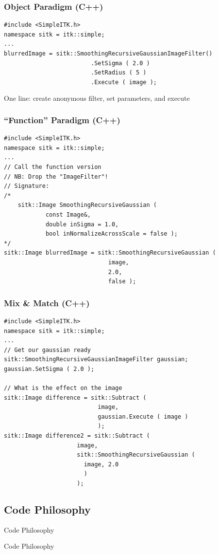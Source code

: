 \begin{frame}[fragile]
\frametitle{Object Paradigm (C++)}
\lstcpp
\begin{lstlisting}
#include <SimpleITK.h>
namespace sitk = itk::simple;
...
blurredImage = sitk::SmoothingRecursiveGaussianImageFilter()
                         .SetSigma ( 2.0 )
                         .SetRadius ( 5 )
                         .Execute ( image );
\end{lstlisting}
One line: create anonymous filter, set parameters, and execute
\end{frame}

\begin{frame}[fragile]
\frametitle{``Function'' Paradigm (C++)}
\lstcpp
\begin{lstlisting}
#include <SimpleITK.h>
namespace sitk = itk::simple;
...
// Call the function version
// NB: Drop the "ImageFilter"!
// Signature:
/*
    sitk::Image SmoothingRecursiveGaussian (
            const Image&,
            double inSigma = 1.0,
            bool inNormalizeAcrossScale = false );
*/
sitk::Image blurredImage = sitk::SmoothingRecursiveGaussian (
                              image,
                              2.0,
                              false );
\end{lstlisting}
\end{frame}

\begin{frame}[fragile]
\frametitle{Mix \& Match (C++)}
\lstcpp
\begin{lstlisting}
#include <SimpleITK.h>
namespace sitk = itk::simple;
...
// Get our gaussian ready
sitk::SmoothingRecursiveGaussianImageFilter gaussian;
gaussian.SetSigma ( 2.0 );

// What is the effect on the image
sitk::Image difference = sitk::Subtract (
                           image,
                           gaussian.Execute ( image )
                           );
sitk::Image difference2 = sitk::Subtract (
                     image,
                     sitk::SmoothingRecursiveGaussian (
                       image, 2.0
                       )
                     );

\end{lstlisting}
\end{frame}



\subsection{Code Philosophy}
\begin{frame}{Code Philosophy}
\fontsize{36pt}{36pt}\selectfont
\center
\begin{center}
Code Philosophy
\end{center}
\end{frame}

